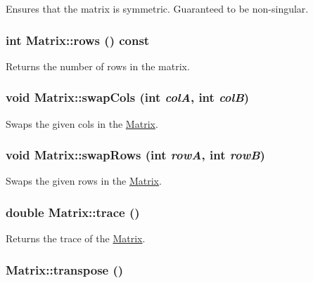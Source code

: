 Ensures that the matrix is symmetric. Guaranteed to be non-\/singular. \hypertarget{class_matrix_af238216c5c5ebf0a80e37bba96c99662}{
\subsubsection[{rows}]{\setlength{\rightskip}{0pt plus 5cm}int Matrix::rows () const}}
\label{class_matrix_af238216c5c5ebf0a80e37bba96c99662}


Returns the number of rows in the matrix. 

\hypertarget{class_matrix_a505f924baa7c236280751499da56ecee}{
\subsubsection[{swapCols}]{\setlength{\rightskip}{0pt plus 5cm}void Matrix::swapCols (int {\em colA}, \/  int {\em colB})}}
\label{class_matrix_a505f924baa7c236280751499da56ecee}


Swaps the given cols in the \hyperlink{class_matrix}{Matrix}. 

\hypertarget{class_matrix_ac0e73d5e98817e12b82a3f626c8343de}{
\subsubsection[{swapRows}]{\setlength{\rightskip}{0pt plus 5cm}void Matrix::swapRows (int {\em rowA}, \/  int {\em rowB})}}
\label{class_matrix_ac0e73d5e98817e12b82a3f626c8343de}


Swaps the given rows in the \hyperlink{class_matrix}{Matrix}. 

\hypertarget{class_matrix_af7403d8c02553a4fba253380e4e0bc40}{
\subsubsection[{trace}]{\setlength{\rightskip}{0pt plus 5cm}double Matrix::trace ()}}
\label{class_matrix_af7403d8c02553a4fba253380e4e0bc40}


Returns the trace of the \hyperlink{class_matrix}{Matrix}. 

\hypertarget{class_matrix_ae23f817021383e3c8636a714dcba1d21}{
\subsubsection[{transpose}]{ Matrix::transpose ()}}
\label{class_matrix_ae23f817021383e3c8636a714dcba1d21}



